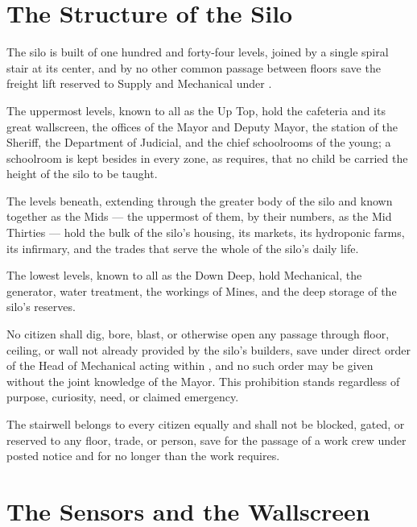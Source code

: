 \section{The Structure of the Silo}
\label{sec:founding:structure-of-the-silo}

The silo is built of one hundred and forty-four levels, joined by a single spiral stair at its center, and by no other common passage between floors save the freight lift reserved to Supply and Mechanical under .

\begin{clauses}
\item The uppermost levels, known to all as the Up Top, hold the cafeteria and its great wallscreen, the offices of the Mayor and Deputy Mayor, the station of the Sheriff, the Department of Judicial, and the chief schoolrooms of the young; a schoolroom is kept besides in every zone, as  requires, that no child be carried the height of the silo to be taught.
\item The levels beneath, extending through the greater body of the silo and known together as the Mids --- the uppermost of them, by their numbers, as the Mid Thirties --- hold the bulk of the silo's housing, its markets, its hydroponic farms, its infirmary, and the trades that serve the whole of the silo's daily life.
\item The lowest levels, known to all as the Down Deep, hold Mechanical, the generator, water treatment, the workings of Mines, and the deep storage of the silo's reserves.
\item No citizen shall dig, bore, blast, or otherwise open any passage through floor, ceiling, or wall not already provided by the silo's builders, save under direct order of the Head of Mechanical acting within , and no such order may be given without the joint knowledge of the Mayor. This prohibition stands regardless of purpose, curiosity, need, or claimed emergency.
\item The stairwell belongs to every citizen equally and shall not be blocked, gated, or reserved to any floor, trade, or person, save for the passage of a work crew under posted notice and for no longer than the work requires.
\end{clauses}

\section{The Sensors and the Wallscreen}
\label{sec:founding:sensors-and-the-wallscreen}

